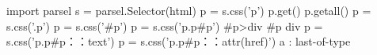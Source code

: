 import parsel 
s = parsel.Selector(html)
p = s.css('p')  %
p.get()     %
p.getall()  %
p = s.css('.p') %
p = s.css('#p') %
p = s.css('p.p#p') %
#p>div    %
#p div    %
p = s.css('p.p#p：：text') %
p = s.css('p.p#p：：attr(href)') %
a : last-of-type  %








